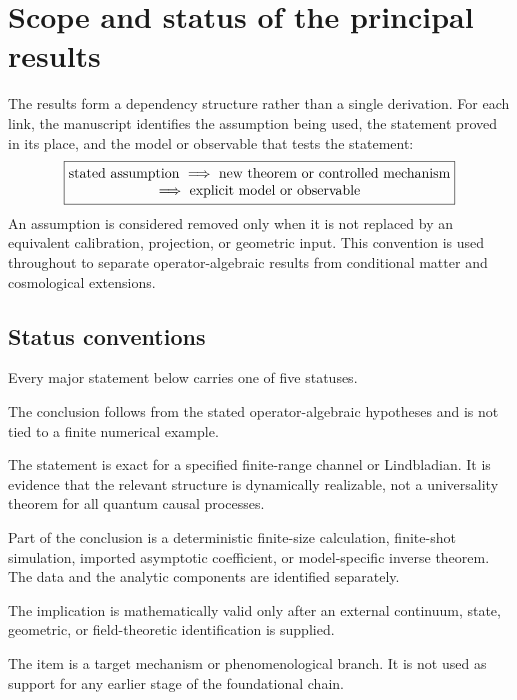 \section{Scope and status of the principal results}
\label{sec:status-map}

The results form a dependency structure rather than a single derivation.
For each link, the manuscript identifies the assumption being used, the
statement proved in its place, and the model or observable that tests the
statement:
\begin{equation}
 \boxed{\begin{gathered}
 \text{stated assumption}
 \ \Longrightarrow\
 \text{new theorem or controlled mechanism}\\[-1mm]
 \Longrightarrow\
 \text{explicit model or observable}
 \end{gathered}}
 \label{eq:closed-loop-rule}
\end{equation}
An assumption is considered removed only when it is not replaced by an
equivalent calibration, projection, or geometric input.  This convention is
used throughout to separate operator-algebraic results from conditional
matter and cosmological extensions.

\subsection{Status conventions}

Every major statement below carries one of five statuses.
\begin{description}[leftmargin=3.6cm,style=nextline]
\item[\StatusAbstract.]
The conclusion follows from the stated operator-algebraic hypotheses and is
not tied to a finite numerical example.
\item[\StatusModel.]
The statement is exact for a specified finite-range channel or Lindbladian.
It is evidence that the relevant structure is dynamically realizable, not a
universality theorem for all quantum causal processes.
\item[\StatusNumerical.]
Part of the conclusion is a deterministic finite-size calculation,
finite-shot simulation, imported asymptotic coefficient, or model-specific
inverse theorem.  The data and the analytic components are identified
separately.
\item[\StatusConditional.]
The implication is mathematically valid only after an external continuum,
state, geometric, or field-theoretic identification is supplied.
\item[\StatusOpen.]
The item is a target mechanism or phenomenological branch.  It is not used as
support for any earlier stage of the foundational chain.
\end{description}

